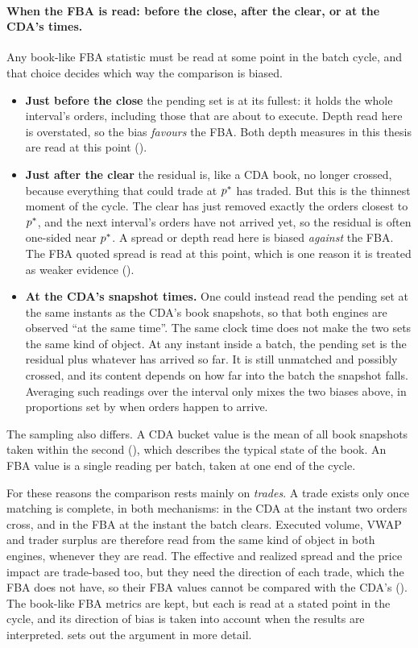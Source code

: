 \paragraph{When the FBA is read: before the close, after the clear, or at
the CDA's times.} Any book-like FBA statistic must be read at some point
in the batch cycle, and that choice decides which way the comparison is
biased.
\begin{itemize}
  \item \textbf{Just before the close} the pending set is at its fullest:
  it holds the whole interval's orders, including those that are about to
  execute. Depth read here is overstated, so the bias \emph{favours} the
  FBA. Both depth measures in this thesis are read at this point
  ().
  \item \textbf{Just after the clear} the residual is, like a CDA book,
  no longer crossed, because everything that could trade at $p^{\ast}$ has
  traded. But this is the thinnest moment of the cycle. The clear has
  just removed exactly the orders closest to $p^{\ast}$, and the next
  interval's orders have not arrived yet, so the residual is often
  one-sided near $p^{\ast}$. A spread or depth read here is biased
  \emph{against} the FBA. The FBA quoted spread is read at this point,
  which is one reason it is treated as weaker evidence
  ().
  \item \textbf{At the CDA's snapshot times.} One could instead read the
  pending set at the same instants as the CDA's book snapshots, so that
  both engines are observed ``at the same time''. The same clock time
  does not make the two sets the same kind of object. At any instant
  inside a batch, the pending set is the residual plus whatever has
  arrived so far. It is still unmatched and possibly crossed, and its
  content depends on how far into the batch the snapshot falls.
  Averaging such readings over the interval only mixes the two biases
  above, in proportions set by when orders happen to arrive.
\end{itemize}
The sampling also differs. A CDA bucket value is the mean of all book
snapshots taken within the second (), which
describes the typical state of the book. An FBA value is a single reading
per batch, taken at one end of the cycle.

For these reasons the comparison rests mainly on \emph{trades}. A trade
exists only once matching is complete, in both mechanisms: in the CDA
at the instant two orders cross, and in the FBA at the instant the batch
clears. Executed volume, VWAP and trader surplus are therefore read from
the same kind of object in both engines, whenever they are read. The
effective and realized spread and the price impact are trade-based too,
but they need the direction of each trade, which the FBA does not have, so
their FBA values cannot be compared with the CDA's
().
The book-like FBA metrics are kept, but each is read at a stated point in
the cycle, and its direction of bias is taken into account when the
results are interpreted.  sets out the argument
in more detail.

